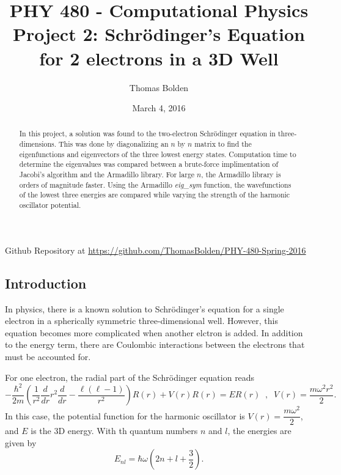 \documentclass[11pt]{article}
\title{PHY 480 - Computational Physics \\ Project 2: Schr\"{o}dinger's Equation for 2 electrons in a 3D Well}
\author{Thomas Bolden}
\date{March 4, 2016}
\begin{document}
\maketitle

\thispagestyle{empty}

\centerline{Github Repository at \href{https://github.com/ThomasBolden/PHY-480-Spring-2016}{https://github.com/ThomasBolden/PHY-480-Spring-2016}}

\begin{abstract}

    In this project, a solution was found to the two-electron Schr\"{o}dinger equation in three-dimensions. This was done by diagonalizing an $n$ by $n$ matrix to find the eigenfunctions and eigenvectors of the three lowest energy states. Computation time to determine the eigenvalues was compared between a brute-force implimentation of Jacobi's algorithm and the Armadillo library. For large $n$, the Armadillo library is orders of magnitude faster. Using the Armadillo {\em eig\_sym} function, the wavefunctions of the lowest three energies are compared while varying the strength of the harmonic oscillator potential.

\end{abstract}

\vfill

\tableofcontents

\vspace{3cm}

\pagebreak

\subsection{Introduction}

    In physics, there is a known solution to Schr\"{o}dinger's equation for a single electron in a spherically symmetric three-dimensional well. However, this equation becomes more complicated when another elctron is added. In addition to the energy term, there are Coulombic interactions between the electrons that must be accounted for. 

    For one electron, the radial part of the Schr\"{o}dinger equation reads
    \[ -\dfrac{\hbar^2}{2m} \left( \dfrac{1}{r^2} \dfrac{d}{dr}r^2\dfrac{d}{dr} - \dfrac{\ell (\ell -1)}{r^2} \right) R(r) + V(r) R(r) = E R(r) \;\; , \;\; V(r) = \dfrac{m\omega^2 r^2}{2}. \]
    In this case, the potential function for the harmonic oscillator is $V(r) = \dfrac{m\omega^2}{2}$, and $E$ is the 3D energy. With th quantum numbers $n$ and $l$, the energies are given by
    \[ E_{nl} = \hbar \omega \left( 2n+l+\dfrac{3}{2} \right). \]
\end{document}

